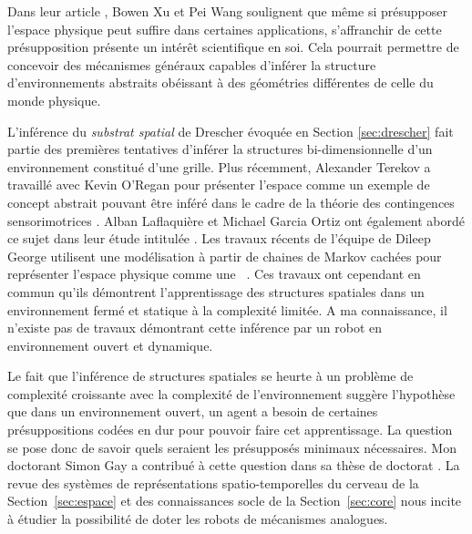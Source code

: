 Dans leur article  \cite{xu_essence_2025}, Bowen Xu et Pei Wang soulignent que même si présupposer l'espace physique peut suffire dans certaines applications, s'affranchir de cette présupposition présente un intérêt scientifique en soi.
Cela pourrait permettre de concevoir des mécanismes généraux capables d'inférer la structure d'environnements abstraits obéissant à des géométries différentes de celle du monde physique. 

L'inférence du \emph{substrat spatial} de Drescher évoquée en Section \ref{sec:drescher} fait partie des premières tentatives d'inférer la structures bi-dimensionnelle d'un environnement constitué d'une grille. 
Plus récemment, Alexander Terekov a travaillé avec Kevin O'Regan pour présenter l'espace comme un exemple de concept abstrait pouvant être inféré dans le cadre de la théorie des contingences sensorimotrices \cite{terekhov_learning_2019}.  
Alban Laflaquière et Michael Garcia Ortiz ont également abordé ce sujet dans leur étude intitulée \og {} \fg \cite{laflaquiere_unsupervised_2019}.
Les travaux récents de l'équipe de Dileep George utilisent une modélisation à partir de chaines de Markov cachées pour représenter l'espace physique comme une  \og {} \fg\ \cite{raju_space_2022}.
Ces travaux ont cependant en commun qu'ils démontrent l'apprentissage des structures spatiales dans un environnement fermé et statique à la complexité limitée. 
A ma connaissance, il n'existe pas de travaux démontrant cette inférence par un robot en environnement ouvert et dynamique. 


Le fait que l'inférence de structures spatiales se heurte à un problème de complexité croissante avec la complexité de l'environnement suggère l'hypothèse que dans un environnement ouvert, un agent a besoin de certaines présuppositions codées en dur pour pouvoir faire cet apprentissage. 
La question se pose donc de savoir quels seraient les présupposés minimaux nécessaires.  
Mon doctorant Simon Gay a contribué à cette question dans sa thèse de doctorat \cite{gay_autonomous_2017}. 
La revue des systèmes de représentations spatio-temporelles du cerveau de la Section~\ref{sec:espace} et des connaissances socle de la Section~\ref{sec:core} nous incite à étudier la possibilité de doter les robots de mécanismes analogues.


